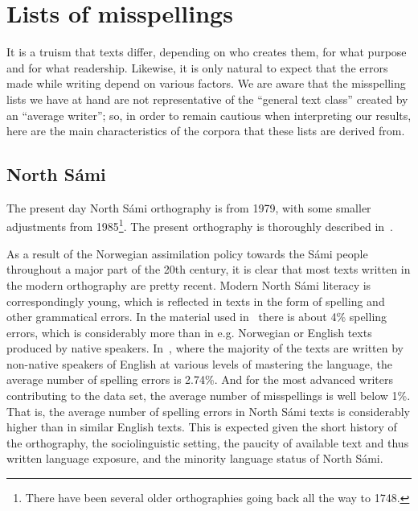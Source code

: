 \documentclass{flammie}
\begin{document}
\section{Lists of misspellings}

It is a truism that texts differ, depending on who creates them, for what
purpose and for what readership. Likewise, it is only natural to expect that the
errors made while writing depend on various factors. We are aware that the
misspelling lists we have at hand are not representative of the ``general text
class'' created by an ``average writer''; so, in order to remain cautious when
interpreting our results, here are the main characteristics of the  corpora that
these lists are derived from.

\subsection{North Sámi}

The present day North Sámi orthography is from 1979, with some smaller
adjustments from 1985\footnote{There have been several older orthographies going
back all the way to 1748.}. The present orthography is thoroughly described
in~\cite{nickel2011nordsamisk}.

As a result of the Norwegian assimilation policy towards the Sámi people
throughout a major part of the 20th century, it is clear that most texts written
in the modern orthography are pretty recent. Modern North Sámi literacy is
correspondingly young, which is reflected in texts in the form of spelling and
other grammatical errors. In the material used
in~\cite{antonsen2013callinmeattahusaid} there is about 4\% spelling errors,
which is considerably more than in e.g. Norwegian or English texts produced by
native speakers. In~\cite{flor2015patterns}, where the majority of the texts are
written by non-native speakers of English at various levels of mastering the
language, the average number of spelling errors is 2.74\%. And for the most
advanced writers contributing to the data set, the average number of
misspellings is well below 1\%. That is, the average number of spelling errors
in North Sámi texts is considerably higher than in similar English texts. This
is expected given the short history of the orthography, the sociolinguistic
setting, the paucity of available text and thus written language exposure, and
the minority language status of North Sámi.
\end{document}
